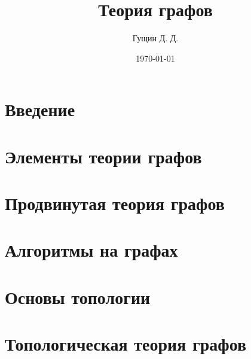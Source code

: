 \documentclass[12pt, twoside]{book}
\author{Гущин Д. Д.}
\title{Теория графов}
\date{\today}
\begin{document}
    \maketitle
    \tableofcontents
	
	
	
	\chapter{Введение}
	  
	  


    \chapter{Элементы теории графов}
	  
	  
	  
	  
	  
	  
	  
	  

	\chapter{Продвинутая теория графов}
 	  
 	  
	  
	  
	  
	  
	\chapter{Алгоритмы на графах}
	 
	\chapter{Основы топологии}
	 
	
	\chapter{Топологическая теория графов}
	  
	  
%	  
%	  
%	  
%	  
%	  
%	  
%	   
%	
%	
	
%	
%	
	
\end{document}
